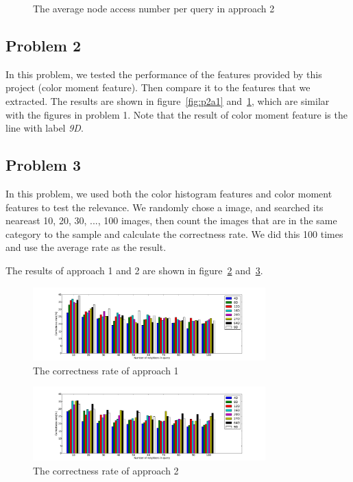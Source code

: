 \documentclass{acm_proc_article-sp}
\begin{document}
\begin{figure}
\centering
{}
\caption{The average node access number per query in approach 2}
\label{fig:p2a2}
\end{figure}

\subsection{Problem 2}
In this problem, we tested the performance of the features provided by this project (color moment feature). Then compare it to the features that we extracted. The results are shown in figure~\ref{fig:p2a1} and~\ref{fig:p2a2}, which are similar with the figures in problem 1. Note that the result of color moment feature is the line with label \textit{9D}.

\subsection{Problem 3}
\label{problem3}
In this problem, we used both the color histogram features and color moment features to test the relevance. We randomly chose a image, and searched its neareast 10, 20, 30, ..., 100 images, then count the images that are in the same category to the sample and calculate the correctness rate. We did this 100 times and use the average rate as the result.

The results of approach 1 and 2 are shown in figure~\ref{fig:p3a1} and~\ref{fig:p3a2}.

\begin{figure}
\centering
\includegraphics[width=0.8\textwidth]{p3a1.pdf}
\caption{The correctness rate of approach 1}
\label{fig:p3a1}
\end{figure}

\begin{figure}
\centering
\includegraphics[width=0.8\textwidth]{p3a2.pdf}
\caption{The correctness rate of approach 2}
\label{fig:p3a2}
\end{figure}
\end{document}
